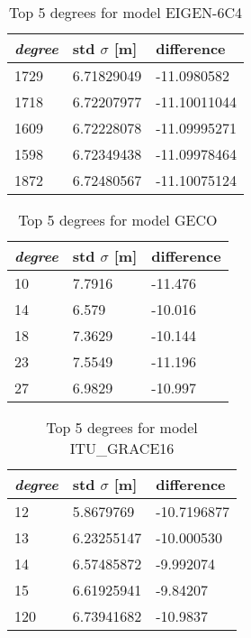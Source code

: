     \begin{table}[]
    	\centering
    	\caption{Top 5 degrees for model EIGEN-6C4}
    	\label{table:ggm_models}
    	\begin{tabular}{@{}lll@{}}
    		\toprule
    		\emph{degree} & std $\sigma$ [m]  & difference\\ \midrule
    		
    		1729 &6.71829049 &-11.0980582\\
    		1718 &6.72207977 &-11.10011044\\
    		1609 &6.72228078 &-11.09995271\\
    		1598 &6.72349438 &-11.09978464\\
    		1872 & 6.72480567 & -11.10075124\\ \bottomrule
    		
    	\end{tabular}
    \end{table}
    
    
      \begin{table}[]
      	\centering
      	\caption{Top 5 degrees for model GECO}
      	\label{table:ggm_models_geco}
      	\begin{tabular}{@{}lll@{}}
      		\toprule
      		\emph{degree} & std $\sigma$ [m]  & difference\\ \midrule
      		10 & 7.7916 & -11.476 \\
      		14 &6.579  &-10.016 \\
      		18 &7.3629 &-10.144 \\
      		23 &7.5549 &-11.196 \\
      		27 &6.9829 &-10.997\\ \bottomrule
      		
      	\end{tabular}
      \end{table}
    
    
      \begin{table}[]
      	\centering
      	\caption{Top 5 degrees for model ITU\_GRACE16}
      	\label{table:ggm_models_itu_grace}
      	\begin{tabular}{@{}lll@{}}
      		\toprule
      		\emph{degree} & std $\sigma$ [m]  & difference\\ \midrule
      		12  &   5.8679769 &  -10.7196877\\
      		13  &  6.23255147 & -10.000530\\
      		14  & 6.57485872 &  -9.992074\\
      		15  & 6.61925941  & -9.84207\\
      		120 & 6.73941682 & -10.9837\\ \bottomrule
      		
      	\end{tabular}
      \end{table}
